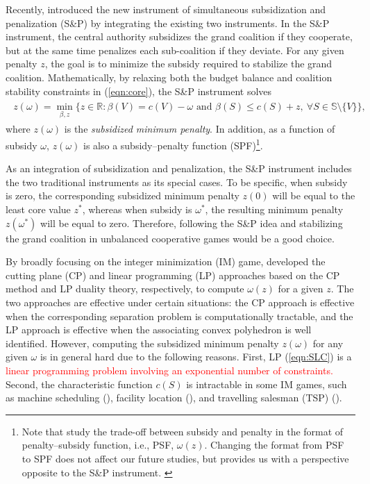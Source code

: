 \documentclass[authoryear,review,12pt]{elsarticle}
\newcommand{\R}{\mathbb{R}}
\begin{document}
Recently, \cite{leastcore2018} introduced the new instrument of simultaneous subsidization and penalization (S\&P) by integrating the existing two instruments.
In the S\&P instrument, the central authority subsidizes the grand coalition if they cooperate, but at the same time penalizes each sub-coalition if they deviate.
For any given penalty $z$, the goal is to minimize the subsidy required to stabilize the grand coalition.
Mathematically, by relaxing both the budget balance and coalition stability constraints in (\ref{eqn:core}), the S\&P instrument solves
\begin{eqnarray}\label{eqn:SLC}
\begin{aligned}
z(\omega) = \min_{\beta,z} \bigg\{ z \in \R:\beta(V)=c(V)-\omega \mbox{ and } \beta(S) \leq c(S)+z,~\forall S \in \mathbb{S} \setminus \{V\} \bigg\},
\end{aligned}
\end{eqnarray}
where $z(\omega)$ is the \textit{subsidized minimum penalty}.
In addition, as a function of subsidy $\omega$, $z(\omega)$ is also a subsidy--penalty function (SPF)\footnote{Note that \cite{leastcore2018} study the trade-off between subsidy and penalty in the format of penalty--subsidy function, i.e., PSF, $\omega(z)$.
Changing the format from PSF to SPF does not affect our future studies, but provides us with a perspective opposite to the S\&P instrument.
 \label{note1}}.


As an integration of subsidization and penalization, the S\&P instrument includes the two traditional instruments as its special cases.
To be specific, when subsidy is zero, the corresponding subsidized minimum penalty $z(0)$ will be equal to the least core value $z^*$, whereas when subsidy is $\omega^*$, the resulting minimum penalty $z(\omega^*)$ will be equal to zero.
Therefore, following the S\&P idea and stabilizing the grand coalition in unbalanced cooperative games would be a good choice.


By broadly focusing on the integer minimization (IM) game, \cite{leastcore2018} developed the cutting plane (CP) and linear programming (LP) approaches based on the CP method and LP duality theory, respectively, to compute $\omega(z)$ for a given $z$.
The two approaches are effective under certain situations: the CP approach is effective when the corresponding separation problem is computationally tractable, and the LP approach is effective when the associating convex polyhedron is well identified.
However, computing the subsidized minimum penalty $z(\omega)$ for any given $\omega$ is in general hard due to the following reasons.
First, LP (\ref{eqn:SLC}) is a \textcolor{red}{linear programming problem involving an exponential number of constraints.}
Second, the characteristic function $c(S)$ is intractable in some IM games, such as machine scheduling (\citealt{leastcore2018}), facility location (\citealt{Kolen1983FL,Goemans2000FL,Puerto2011}), and travelling salesman (TSP) (\citealt{tamir1989core,kimms2016core}).
\end{document}

